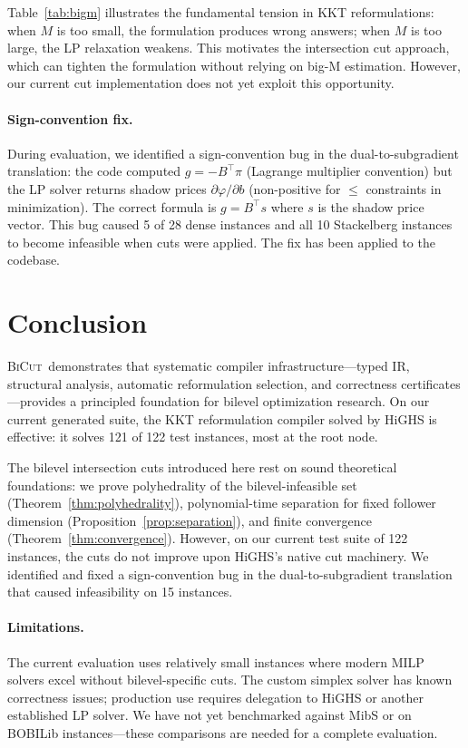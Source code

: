 \documentclass[11pt]{article}
\newcommand{\BiCut}{\textsc{BiCut}}
\begin{document}
Table~\ref{tab:bigm} illustrates the fundamental tension in KKT
reformulations: when $M$ is too small, the formulation produces wrong
answers; when $M$ is too large, the LP relaxation weakens. This motivates
the intersection cut approach, which can tighten the formulation without
relying on big-M estimation. However, our current cut implementation
does not yet exploit this opportunity.

\paragraph{Sign-convention fix.}
\label{sec:sign_fix}
During evaluation, we identified a sign-convention bug in the
dual-to-subgradient translation: the code computed $g = -B^\top \pi$
(Lagrange multiplier convention) but the LP solver returns shadow prices
$\partial\varphi/\partial b$ (non-positive for $\leq$ constraints in
minimization). The correct formula is $g = B^\top s$ where $s$ is the
shadow price vector. This bug caused 5 of 28 dense instances and all
10 Stackelberg instances to become infeasible when cuts were applied.
The fix has been applied to the codebase.

\section{Conclusion}
\label{sec:conclusion}

\BiCut\ demonstrates that systematic compiler infrastructure---typed IR,
structural analysis, automatic reformulation selection, and correctness
certificates---provides a principled foundation for bilevel optimization
research. On our current generated suite, the KKT reformulation compiler
solved by HiGHS is effective: it solves 121 of 122 test instances, most at
the root node.

The bilevel intersection cuts introduced here rest on sound theoretical
foundations: we prove polyhedrality of the bilevel-infeasible set
(Theorem~\ref{thm:polyhedrality}), polynomial-time separation for fixed
follower dimension (Proposition~\ref{prop:separation}), and finite
convergence (Theorem~\ref{thm:convergence}). However, on our current
test suite of 122 instances, the cuts do not improve upon HiGHS's native
cut machinery. We identified and fixed a sign-convention bug in the
dual-to-subgradient translation that caused infeasibility on 15 instances.

\paragraph{Limitations.}
The current evaluation uses relatively small instances where modern MILP
solvers excel without bilevel-specific cuts. The custom simplex solver
has known correctness issues; production use requires delegation to HiGHS
or another established LP solver. We have not yet benchmarked against
MibS or on BOBILib instances---these comparisons are needed for a
complete evaluation.
\end{document}
